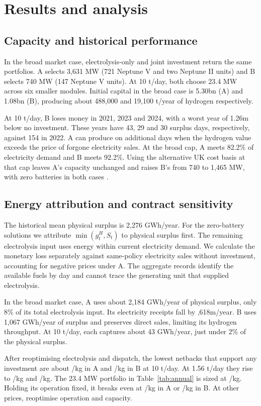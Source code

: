 \newpage
\section{Results and analysis}\label{sec:results1}
\subsection{Capacity and historical performance}
In the broad market case, electrolysis-only and joint investment return
the same portfolios. A selects 3,631 MW (721 Neptune V and two Neptune II
units) and B selects 740 MW (147 Neptune V units). At 10 t/day, both choose
23.4 MW across six smaller modules. Initial capital in the broad case is
\gbp 5.30bn (A) and \gbp 1.08bn (B), producing about 488,000 and
19,100 t/year of hydrogen respectively.

At 10 t/day, B loses money in 2021, 2023 and 2024, with a worst
year of \gbp 1.26m below no investment. These years have 43, 29 and
30 surplus days, respectively, against 154 in 2022. A can produce on
additional days when the hydrogen value exceeds
the price of forgone electricity sales. At the broad cap, A meets 82.2\%
of electricity demand and B meets 92.2\%. Using the alternative UK cost
basis at that cap leaves A's capacity unchanged and raises B's from
740 to 1,465 MW, with zero batteries in both cases \cite{beis,v6}.

\subsection{Energy attribution and contract sensitivity}\label{sec:contract1}
The historical mean physical surplus is 2,276 GWh/year.
For the zero-battery solutions we attribute \(\min(g_t^H,S_t)\) to physical
surplus first. The remaining electrolysis input uses energy within current
electricity demand. We calculate the monetary loss separately against
same-policy electricity sales without investment, accounting for negative
prices under A. The aggregate records identify the available fuels by day
and cannot trace the generating unit that supplied electrolysis.

In the broad market case, A uses about 2,184 GWh/year of physical surplus,
only 8\% of its total electrolysis input. Its electricity receipts fall by
,618m/year. B uses 1,067 GWh/year of surplus and preserves direct
sales, limiting its hydrogen throughput. At 10 t/day, each captures
about 43 GWh/year, just under 2\% of the physical surplus.

\newpage
\noindent
After reoptimising electrolysis and dispatch, the lowest netbacks that
support any investment are about /kg in A and /kg in B
at 10 t/day. At 1.56 t/day they rise to /kg and /kg.
The 23.4 MW portfolio in Table~\ref{tab:annual} is sized at /kg.
Holding its operation fixed, it breaks even at /kg in A or
/kg in B. At other prices, reoptimise operation and capacity.

